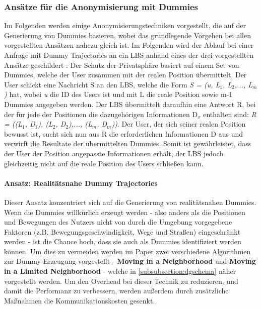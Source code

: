 \subsubsection{Ansätze für die Anonymisierung mit Dummies} \label{subsubsection:realdummy}
Im Folgenden werden einige Anonymisierungstechniken vorgestellt, die auf der Generierung von Dummies basieren, wobei das grundlegende Vorgehen bei allen vorgestellten Ansätzen nahezu gleich ist. Im Folgenden wird der Ablauf bei einer Anfrage mit Dummy Trajectories an ein LBS anhand eines der drei vorgestellten Ansätze geschildert \cite{Kido2005}: Der Schutz der Privatsphäre basiert auf einem Set von Dummies, welche der User zusammen mit der realen Position übermittelt. Der User schickt eine Nachricht S an den LBS, welche die Form \textit{S = (u, L$_{1}$, L$_{2}$,..., L$_{m}$)} hat, wobei \textit{u} die ID des Users ist und mit L die reale Position sowie m-1 Dummies angegeben werden. Der LBS übermittelt daraufhin eine Antwort R, bei der für jede der Positionen die dazugehörigen Informationen D$_{x}$ enthalten sind: \textit{R = ((L$_{1}$, D$_{1}$), (L$_{2}$, D$_{2}$),..., (L$_{m}$, D$_{m}$))}. Der User, der sich seiner realen Position bewusst ist, sucht sich nun aus R die erforderlichen Informationen D aus und verwirft die Resultate der übermittelten Dummies. Somit ist gewährleistet, dass der User der Position angepasste Informationen erhält, der LBS jedoch gleichzeitig nicht auf die reale Position des Users schließen kann.

\paragraph{Ansatz: Realitätsnahe Dummy Trajectories \cite{Kido2005}} \label{para:simple}
Dieser Ansatz konzentriert sich auf die Generierung von realitätsnahen Dummies. Wenn die Dummies willkürlich erzeugt werden - also anders als die Positionen und Bewegungen des Nutzers nicht von durch die Umgebung vorgegebene Faktoren (z.B. Bewegungsgeschwindigkeit, Wege und Straßen) eingeschränkt werden - ist die Chance hoch, dass sie auch als Dummies identifiziert werden können. Um dies zu vermeiden werden im Paper zwei verschiedene Algorithmen zur Dummy-Erzeugung vorgestellt - \textbf{Moving in a Neighborhood} und \textbf{Moving in a Limited Neighborhood} - welche in \ref{subsubsection:dgschema} näher vorgestellt werden. Um den Overhead bei dieser Technik zu reduzieren, und damit die Performanz zu verbessern, werden außerdem durch zusätzliche Maßnahmen die Kommunikationskosten gesenkt.


